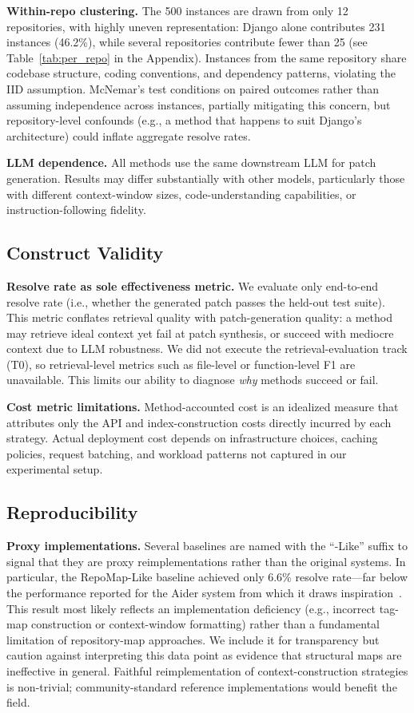 \textbf{Within-repo clustering.}
The 500 instances are drawn from only 12 repositories, with highly uneven representation: Django alone contributes 231 instances (46.2\%), while several repositories contribute fewer than 25 (see Table~\ref{tab:per_repo} in the Appendix).
Instances from the same repository share codebase structure, coding conventions, and dependency patterns, violating the IID assumption.
McNemar's test conditions on paired outcomes rather than assuming independence across instances, partially mitigating this concern, but repository-level confounds (e.g., a method that happens to suit Django's architecture) could inflate aggregate resolve rates.

\textbf{LLM dependence.}
All methods use the same downstream LLM for patch generation.
Results may differ substantially with other models, particularly those with different context-window sizes, code-understanding capabilities, or instruction-following fidelity.

\subsection{Construct Validity}

\textbf{Resolve rate as sole effectiveness metric.}
We evaluate only end-to-end resolve rate (i.e., whether the generated patch passes the held-out test suite).
This metric conflates retrieval quality with patch-generation quality: a method may retrieve ideal context yet fail at patch synthesis, or succeed with mediocre context due to LLM robustness.
We did not execute the retrieval-evaluation track (T0), so retrieval-level metrics such as file-level or function-level F1 are unavailable.
This limits our ability to diagnose \emph{why} methods succeed or fail.

\textbf{Cost metric limitations.}
Method-accounted cost is an idealized measure that attributes only the API and index-construction costs directly incurred by each strategy.
Actual deployment cost depends on infrastructure choices, caching policies, request batching, and workload patterns not captured in our experimental setup.

\subsection{Reproducibility}

\textbf{Proxy implementations.}
Several baselines are named with the ``-Like'' suffix to signal that they are proxy reimplementations rather than the original systems.
In particular, the RepoMap-Like baseline achieved only 6.6\% resolve rate---far below the performance reported for the Aider system from which it draws inspiration~\cite{aider2024repomap}.
This result most likely reflects an implementation deficiency (e.g., incorrect tag-map construction or context-window formatting) rather than a fundamental limitation of repository-map approaches.
We include it for transparency but caution against interpreting this data point as evidence that structural maps are ineffective in general.
Faithful reimplementation of context-construction strategies is non-trivial; community-standard reference implementations would benefit the field.

